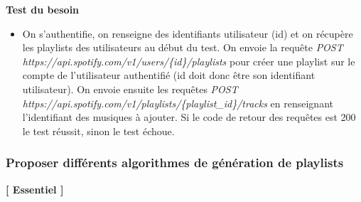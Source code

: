 \documentclass{article}
\begin{document}
		\textbf{Test du besoin}
		\begin{itemize}
			\item On s'authentifie, on renseigne des identifiants utilisateur (id) et on récupère les playlists des utilisateurs au début du test. On envoie la requête \textit{POST https://api.spotify.com/v1/users/\{id\}/playlists} pour créer une playlist sur le compte de l'utilisateur authentifié (id doit donc être son identifiant utilisateur). On envoie ensuite les requêtes \textit{POST https://api.spotify.com/v1/playlists/\{playlist\_id\}\newline/tracks} en renseignant l'identifiant des musiques à ajouter. Si le code de retour des requêtes est 200 le test réussit, sinon le test échoue.
		\end{itemize}
		\subsubsection{Proposer différents algorithmes de génération de playlists}
		\textbf{[ Essentiel ]}
\end{document}
